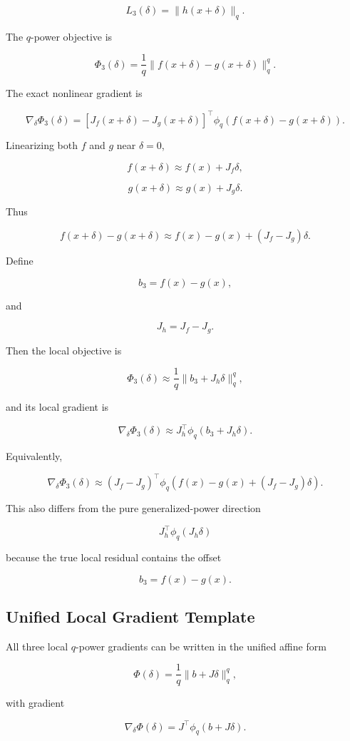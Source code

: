 \documentclass{article}
\begin{document}
\[
L_3(\delta)=\|h(x+\delta)\|_q.
\]

The \(q\)-power objective is

\[
\Phi_3(\delta)
=
\frac{1}{q}
\|f(x+\delta)-g(x+\delta)\|_q^q.
\]

The exact nonlinear gradient is

\[
\nabla_\delta \Phi_3(\delta)
=
\left[
J_f(x+\delta)-J_g(x+\delta)
\right]^\top
\phi_q
\left(
f(x+\delta)-g(x+\delta)
\right).
\]

Linearizing both \(f\) and \(g\) near \(\delta=0\),

\[
f(x+\delta)
\approx
f(x)+J_f\delta,
\]

\[
g(x+\delta)
\approx
g(x)+J_g\delta.
\]

Thus

\[
f(x+\delta)-g(x+\delta)
\approx
f(x)-g(x)+(J_f-J_g)\delta.
\]

Define

\[
b_3=f(x)-g(x),
\]

and

\[
J_h=J_f-J_g.
\]

Then the local objective is

\[
\Phi_3(\delta)
\approx
\frac{1}{q}
\|b_3+J_h\delta\|_q^q,
\]

and its local gradient is

\[
\nabla_\delta \Phi_3(\delta)
\approx
J_h^\top
\phi_q
\left(
b_3+J_h\delta
\right).
\]

Equivalently,

\[
\nabla_\delta \Phi_3(\delta)
\approx
(J_f-J_g)^\top
\phi_q
\left(
f(x)-g(x)+(J_f-J_g)\delta
\right).
\]

This also differs from the pure generalized-power direction

\[
J_h^\top\phi_q(J_h\delta)
\]

because the true local residual contains the offset

\[
b_3=f(x)-g(x).
\]

\subsection{Unified Local Gradient Template}

All three local \(q\)-power gradients can be written in the unified affine form

\[
\Phi(\delta)
=
\frac{1}{q}\|b+J\delta\|_q^q,
\]

with gradient

\[
\nabla_\delta \Phi(\delta)
=
J^\top \phi_q(b+J\delta).
\]
\end{document}
